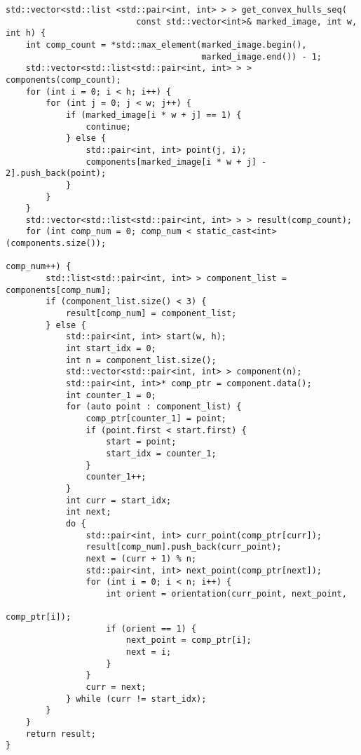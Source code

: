 \documentclass{report}
\begin{document}
\begin{lstlisting}
std::vector<std::list <std::pair<int, int> > > get_convex_hulls_seq(
                          const std::vector<int>& marked_image, int w, int h) {
    int comp_count = *std::max_element(marked_image.begin(),
                                       marked_image.end()) - 1;
    std::vector<std::list<std::pair<int, int> > > components(comp_count);
    for (int i = 0; i < h; i++) {
        for (int j = 0; j < w; j++) {
            if (marked_image[i * w + j] == 1) {
                continue;
            } else {
                std::pair<int, int> point(j, i);
                components[marked_image[i * w + j] - 2].push_back(point);
            }
        }
    }
    std::vector<std::list<std::pair<int, int> > > result(comp_count);
    for (int comp_num = 0; comp_num < static_cast<int>(components.size());
                                                                  comp_num++) {
        std::list<std::pair<int, int> > component_list = components[comp_num];
        if (component_list.size() < 3) {
            result[comp_num] = component_list;
        } else {
            std::pair<int, int> start(w, h);
            int start_idx = 0;
            int n = component_list.size();
            std::vector<std::pair<int, int> > component(n);
            std::pair<int, int>* comp_ptr = component.data();
            int counter_1 = 0;
            for (auto point : component_list) {
                comp_ptr[counter_1] = point;
                if (point.first < start.first) {
                    start = point;
                    start_idx = counter_1;
                }
                counter_1++;
            }
            int curr = start_idx;
            int next;
            do {
                std::pair<int, int> curr_point(comp_ptr[curr]);
                result[comp_num].push_back(curr_point);
                next = (curr + 1) % n;
                std::pair<int, int> next_point(comp_ptr[next]);
                for (int i = 0; i < n; i++) {
                    int orient = orientation(curr_point, next_point,
                                                                 comp_ptr[i]);
                    if (orient == 1) {
                        next_point = comp_ptr[i];
                        next = i;
                    }
                }
                curr = next;
            } while (curr != start_idx);
        }
    }
    return result;
}
\end{lstlisting}
\end{document}
